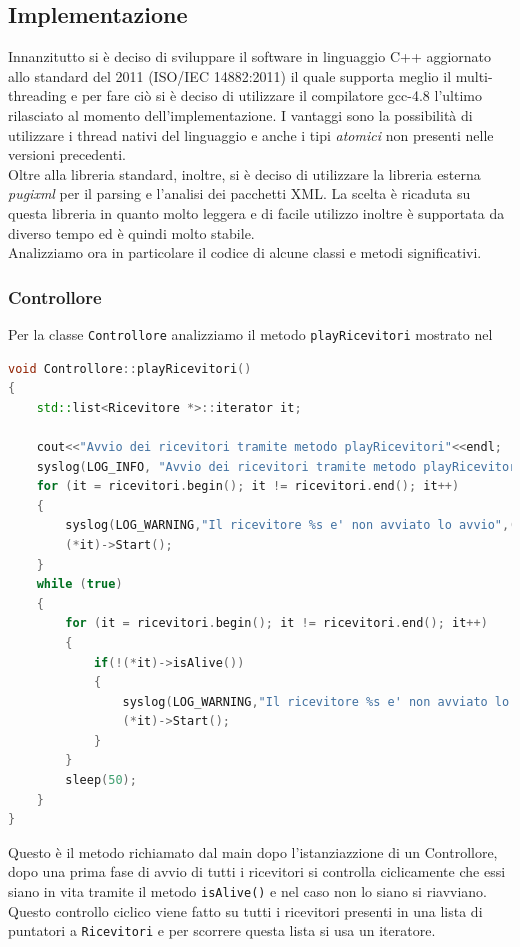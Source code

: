 \subsection{Implementazione}
Innanzitutto si è deciso di sviluppare il software in linguaggio C++ aggiornato allo standard del 2011 (ISO/IEC 14882:2011\cite{c++11}) il quale supporta meglio il multi-threading e per fare ciò si è deciso di utilizzare il compilatore gcc-4.8 l'ultimo rilasciato al momento dell'implementazione. I vantaggi sono la possibilità di utilizzare i thread nativi del linguaggio e anche i tipi \emph{atomici} non presenti nelle versioni precedenti.\\
Oltre alla libreria standard, inoltre, si è deciso di utilizzare la libreria esterna \emph{pugixml}\cite{pugi} per il parsing e l'analisi dei pacchetti XML. La scelta è ricaduta su questa libreria in quanto molto leggera e di facile utilizzo inoltre è supportata da diverso tempo ed è quindi molto stabile.\\
Analizziamo ora in particolare il codice di alcune classi e metodi significativi.
\subsubsection{Controllore}
Per la classe \texttt{Controllore} analizziamo il metodo \texttt{playRicevitori} mostrato nel 
\begin{lstlisting}[language=C++,caption=Metodo playRicevitori,label=lst:playriccode]
void Controllore::playRicevitori()
{
	std::list<Ricevitore *>::iterator it;

	cout<<"Avvio dei ricevitori tramite metodo playRicevitori"<<endl;
	syslog(LOG_INFO, "Avvio dei ricevitori tramite metodo playRicevitori");
	for (it = ricevitori.begin(); it != ricevitori.end(); it++)
	{
		syslog(LOG_WARNING,"Il ricevitore %s e' non avviato lo avvio",(*it)->getNome());
		(*it)->Start();
	}
	while (true)
	{
		for (it = ricevitori.begin(); it != ricevitori.end(); it++)
		{
			if(!(*it)->isAlive())
			{
				syslog(LOG_WARNING,"Il ricevitore %s e' non avviato lo avvio",(*it)->getNome());
				(*it)->Start();
			}
		}
		sleep(50);
	}
}
\end{lstlisting}
Questo è il metodo richiamato dal main dopo l'istanziazzione di un Controllore, dopo una prima fase di avvio di tutti i ricevitori si controlla ciclicamente che essi siano in vita tramite il metodo \texttt{isAlive()} e nel caso non lo siano si riavviano. Questo controllo ciclico viene fatto su tutti i ricevitori presenti in una lista di puntatori a \texttt{Ricevitori} e per scorrere questa lista si usa un iteratore.
